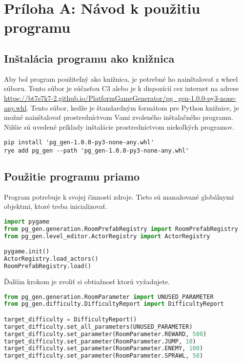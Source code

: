 \section*{Príloha A: Návod k použitiu programu}

\subsection*{Inštalácia programu ako knižnica}

Aby bol program použiteľný ako knižnica, je potrebné ho nainštalovať z wheel súboru. Tento súbor je súčasťou C3 alebo je k dispozícií cez internet na adrese \url{https://bt7s7k7-2.github.io/PlatformGameGenerator/pg_gen-1.0.0-py3-none-any.whl}. Tento súbor, kedže je štandardným formátom pre Python knižnice, je možné nainštalovať prostredníctvom Vami zvoleného inštalačného programu. Nižšie sú uvedené príklady inštalácie prostredníctvom niekoľkých programov.

\begin{lstlisting}
pip install 'pg_gen-1.0.0-py3-none-any.whl'
rye add pg_gen --path 'pg_gen-1.0.0-py3-none-any.whl'
\end{lstlisting}


\subsection*{Použitie programu priamo}

Program potrebuje k svojej činnosti zdroje. Tieto sú manažované globálnymi objektmi, ktoré treba inicializovať.

\begin{lstlisting}[language=python]
import pygame
from pg_gen.generation.RoomPrefabRegistry import RoomPrefabRegistry
from pg_gen.level_editor.ActorRegistry import ActorRegistry

pygame.init()
ActorRegistry.load_actors()
RoomPrefabRegistry.load()
\end{lstlisting}

Ďalším krokom je zvoliť si obtiažnosť ktorú vyžadujete.

\begin{lstlisting}[language=python]
from pg_gen.generation.RoomParameter import UNUSED_PARAMETER
from pg_gen.difficulty.DifficultyReport import DifficultyReport

target_difficulty = DifficultyReport()
target_difficulty.set_all_parameters(UNUSED_PARAMETER)
target_difficulty.set_parameter(RoomParameter.REWARD, 500)
target_difficulty.set_parameter(RoomParameter.JUMP, 10)
target_difficulty.set_parameter(RoomParameter.ENEMY, 100)
target_difficulty.set_parameter(RoomParameter.SPRAWL, 50)
\end{lstlisting}



